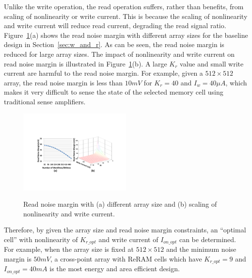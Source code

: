 Unlike the write operation, the read operation suffers, rather than
benefits, from scaling of nonlinearity or write current. This is because
the scaling of nonlinearity and write current will reduce read current,
degrading the read signal ratio. Figure~\ref{fig:sense_margin}(a) shows
the read noise margin with different array sizes for the baseline design
in Section~\ref{sec:w_and_r}.  As can be seen, the read noise margin is
reduced for large array sizes. The impact of nonlinearity and write
current on read noise margin is illustrated in
Figure~\ref{fig:sense_margin}(b). A large $K_r$ value and small write
current are harmful to the read noise margin. For example, given a $512
\times 512$ array, the read noise margin is less than $10mV$ for $K_r=40$
and $I_w=40\mu A$, which makes it very difficult to sense the state of the
selected memory cell using traditional sense amplifiers.

\begin{figure}[!t]
\centering
  \includegraphics[width=0.5\textwidth]{./figures/read}\\
  \caption{Read noise margin with (a) different array size and (b) scaling of nonlinearity and write current.}\label{fig:sense_margin}
  \vspace{-5pt}
\end{figure}

Therefore, by given the array size and read noise margin constraints, an
``optimal cell'' with nonlinearity of $K_{r\_opt}$ and write current of
$I_{on\_opt}$ can be determined. For example, when the array size is fixed
at $512 \times 512$ and the minimum noise margin is $50mV$, a cross-point
array with ReRAM cells which have $K_{r\_opt} = 9$ and $I_{on\_opt} =
40mA$ is the most energy and area efficient design.


